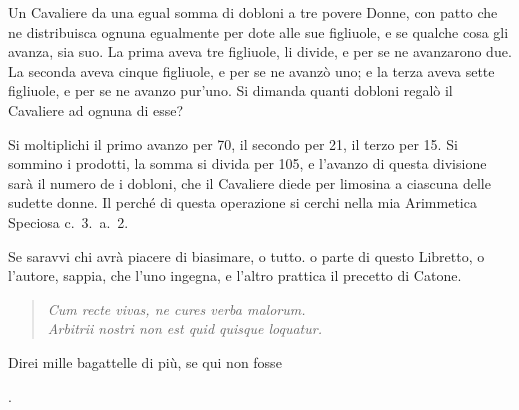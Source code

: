 \documentclass[11pt,a6paper]{article}
\newcommand{\literaryquote}[1]{%
\kern -6pt  \begin{verse}
    {\footnotesize \it #1}
  \end{verse}\kern -2pt%
}
\begin{document}
Un Cavaliere da una egual somma di dobloni a
tre povere Donne, con patto che ne distribuisca
ognuna egualmente per dote alle sue figliuole, e se
qualche cosa gli avanza, sia suo. La prima aveva
tre figliuole, li divide, e per se ne avanzarono due.
La seconda aveva cinque figliuole, e per se ne avanzò
uno; e la terza aveva sette figliuole, e per se ne
avanzo pur'uno. Si dimanda quanti dobloni regalò
il Cavaliere ad ognuna di esse?

Si moltiplichi il primo avanzo per 70, il secondo
per 21, il terzo per 15. Si sommino i prodotti, la
somma si divida per 105, e l'avanzo di questa divisione
sarà il numero de i dobloni, che il Cavaliere
diede per limosina a ciascuna delle sudette donne.
Il perché di questa operazione si cerchi nella mia
Arimmetica Speciosa c.\ 3.\ a.\ 2.

Se saravvi chi avrà piacere di biasimare, o tutto.
o parte di questo Libretto, o l'autore, sappia,
che l'uno ingegna, e l'altro prattica il precetto di
Catone.

\literaryquote{Cum recte vivas, ne cures verba malorum.\\
Arbitrii nostri non est quid quisque loquatur.}

Direi mille bagattelle di più, se qui non fosse

{\centering\LARGE\textbf{}.\\}
\end{document}
